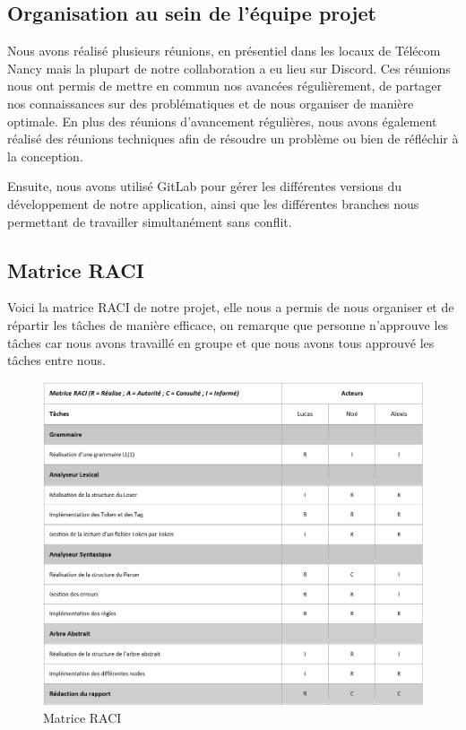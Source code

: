 \documentclass[french,a4paper]{article}
\begin{document}
    \subsection{Organisation au sein de l’équipe projet}\label{subsec:organisation-au-sein-de-lequipe-projet}
    Nous avons réalisé plusieurs réunions, en présentiel dans les locaux de Télécom Nancy mais la plupart de notre collaboration a eu lieu sur Discord.
    Ces réunions nous ont permis de mettre en commun nos avancées régulièrement, de partager nos connaissances sur des problématiques et de nous organiser de manière optimale.
    En plus des réunions d'avancement régulières, nous avons également réalisé des réunions techniques afin de résoudre un problème ou bien de réfléchir à la conception.

    Ensuite, nous avons utilisé GitLab pour gérer les différentes versions du développement de notre application, ainsi que les différentes
    branches nous permettant de travailler simultanément sans conflit.

    \subsection{Matrice RACI}\label{subsec:matrice-raci}
    Voici la matrice RACI de notre projet, elle nous a permis de nous organiser et de répartir les tâches de manière efficace, on remarque que personne n'approuve les tâches car nous avons travaillé en groupe et que nous avons tous approuvé les tâches entre nous.

    \begin{figure}[H]
        \centering
        \includegraphics[width=1\textwidth]{RACI}
        \caption{Matrice RACI}\label{fig:figure3}
    \end{figure}
\end{document}
